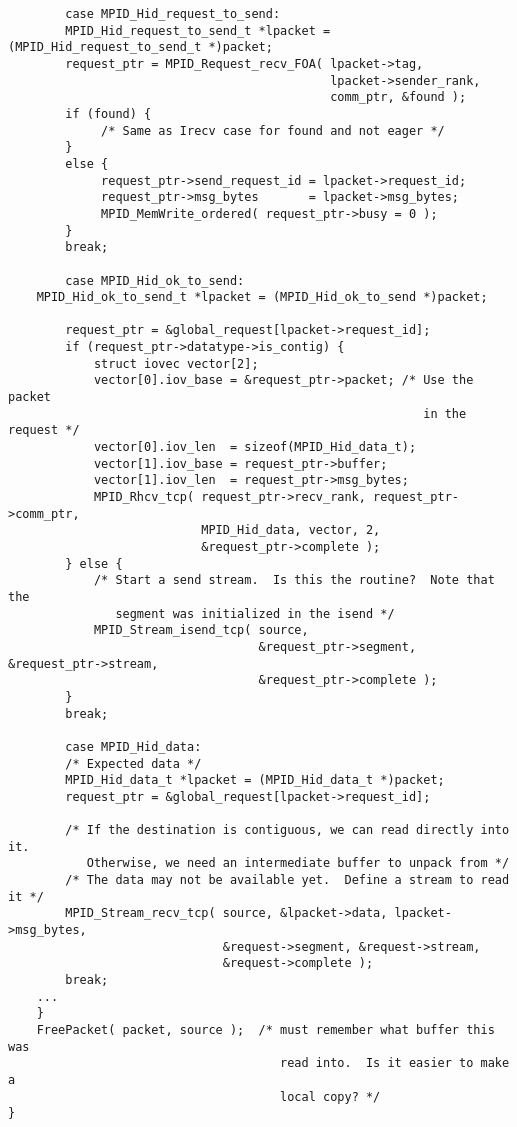 \begin{verbatim}
        case MPID_Hid_request_to_send:
        MPID_Hid_request_to_send_t *lpacket = (MPID_Hid_request_to_send_t *)packet;
        request_ptr = MPID_Request_recv_FOA( lpacket->tag, 
                                             lpacket->sender_rank, 
                                             comm_ptr, &found );
        if (found) {
             /* Same as Irecv case for found and not eager */
        }
        else {
             request_ptr->send_request_id = lpacket->request_id;
             request_ptr->msg_bytes       = lpacket->msg_bytes;
             MPID_MemWrite_ordered( request_ptr->busy = 0 );
        }
        break;

        case MPID_Hid_ok_to_send:
	MPID_Hid_ok_to_send_t *lpacket = (MPID_Hid_ok_to_send *)packet;

        request_ptr = &global_request[lpacket->request_id];
        if (request_ptr->datatype->is_contig) {
            struct iovec vector[2];
            vector[0].iov_base = &request_ptr->packet; /* Use the packet 
                                                          in the request */
            vector[0].iov_len  = sizeof(MPID_Hid_data_t);
            vector[1].iov_base = request_ptr->buffer;
            vector[1].iov_len  = request_ptr->msg_bytes;
            MPID_Rhcv_tcp( request_ptr->recv_rank, request_ptr->comm_ptr, 
                           MPID_Hid_data, vector, 2, 
                           &request_ptr->complete );
        } else {
            /* Start a send stream.  Is this the routine?  Note that the
               segment was initialized in the isend */
            MPID_Stream_isend_tcp( source, 
                                   &request_ptr->segment, &request_ptr->stream,
                                   &request_ptr->complete );
        }
        break;

        case MPID_Hid_data:
        /* Expected data */
        MPID_Hid_data_t *lpacket = (MPID_Hid_data_t *)packet;
        request_ptr = &global_request[lpacket->request_id];

        /* If the destination is contiguous, we can read directly into it.
           Otherwise, we need an intermediate buffer to unpack from */
        /* The data may not be available yet.  Define a stream to read it */
        MPID_Stream_recv_tcp( source, &lpacket->data, lpacket->msg_bytes, 
                              &request->segment, &request->stream, 
                              &request->complete );
        break;
    ...
    }
    FreePacket( packet, source );  /* must remember what buffer this was
                                      read into.  Is it easier to make a 
                                      local copy? */
}
\end{verbatim}

